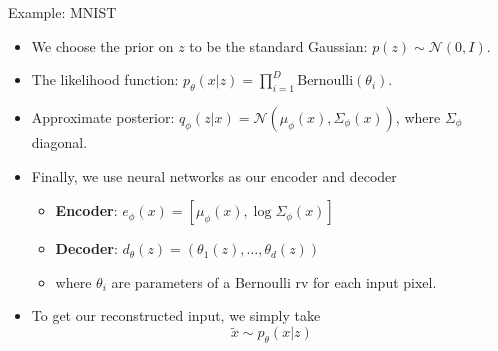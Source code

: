 \documentclass[handout,aspectratio=169]{beamer}
\begin{document}
%
%
%
%
\begin{frame}{Example: MNIST}

  \begin{itemize}
  \item We choose the prior on $z$ to be the standard Gaussian:\;\;\;
    $
    p(z)\sim\mathcal{N}(0, I).
    $\\[3mm]

    \item The likelihood function:\;\;\;
    $
    p_\theta(x | z) = \prod_{i=1}^D\text{Bernoulli}(\theta_i).
    $\\[3mm]

    \item Approximate posterior:\;\;\;
    $
    q_{\phi}(z | x) = \mathcal{N}(\mu_\phi(x), \Sigma_\phi(x))
    $, where $\Sigma_\phi$ diagonal.\\[3mm]

  \item Finally, we use neural networks as our encoder and decoder
    \begin{itemize}
    \item \textbf{Encoder}:  $e_\phi(x) =  [\mu_\phi(x), \log \Sigma_\phi(x)]$
\item \textbf{Decoder}:  $d_\theta(z) = (\theta_1(z),\ldots,\theta_d(z))$
\item      where  $\theta_i$ are parameters of a Bernoulli rv for each input pixel.
    \end{itemize}
\item To get our reconstructed input, we simply take
    $$
    \tilde x \sim p_{\theta}(x | z)
    $$
  \end{itemize}
\end{frame}
\end{document}

